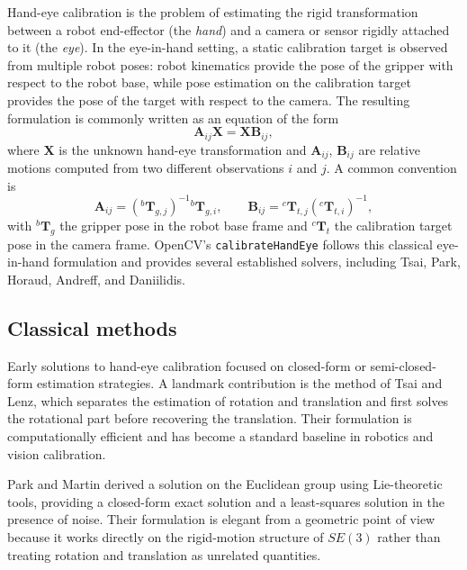Hand-eye calibration is the problem of estimating the rigid transformation between a robot end-effector (the \emph{hand}) and a camera or sensor rigidly attached to it (the \emph{eye}). In the eye-in-hand setting, a static calibration target is observed from multiple robot poses: robot kinematics provide the pose of the gripper with respect to the robot base, while pose estimation on the calibration target provides the pose of the target with respect to the camera. The resulting formulation is commonly written as an equation of the form
\begin{equation}
\mathbf{A}_{ij}\mathbf{X} = \mathbf{X}\mathbf{B}_{ij},
\label{eq:axxb}
\end{equation}
where \(\mathbf{X}\) is the unknown hand-eye transformation and \(\mathbf{A}_{ij}\), \(\mathbf{B}_{ij}\) are relative motions computed from two different observations \(i\) and \(j\). A common convention is
\begin{equation}
\mathbf{A}_{ij} = \left({}^{b}\mathbf{T}_{g,j}\right)^{-1} {}^{b}\mathbf{T}_{g,i},
\qquad
\mathbf{B}_{ij} = {}^{c}\mathbf{T}_{t,j}\left({}^{c}\mathbf{T}_{t,i}\right)^{-1},
\end{equation}
with \({}^{b}\mathbf{T}_{g}\) the gripper pose in the robot base frame and \({}^{c}\mathbf{T}_{t}\) the calibration target pose in the camera frame. OpenCV's \texttt{calibrateHandEye} follows this classical eye-in-hand formulation and provides several established solvers, including Tsai, Park, Horaud, Andreff, and Daniilidis. \cite{OpenCVHandEye}

\subsection*{Classical methods}

Early solutions to hand-eye calibration focused on closed-form or semi-closed-form estimation strategies. A landmark contribution is the method of Tsai and Lenz, which separates the estimation of rotation and translation and first solves the rotational part before recovering the translation. Their formulation is computationally efficient and has become a standard baseline in robotics and vision calibration. \cite{Tsai1989}

Park and Martin derived a solution on the Euclidean group using Lie-theoretic tools, providing a closed-form exact solution and a least-squares solution in the presence of noise. Their formulation is elegant from a geometric point of view because it works directly on the rigid-motion structure of \(SE(3)\) rather than treating rotation and translation as unrelated quantities. \cite{ParkMartin1994}

